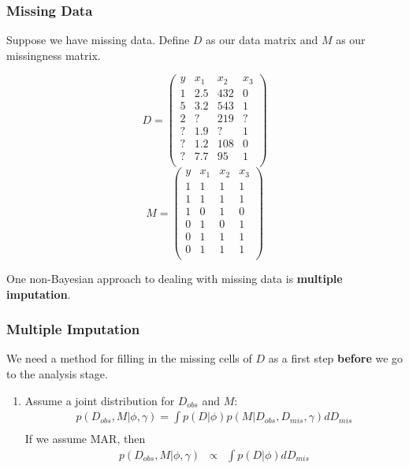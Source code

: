 \documentclass{beamer}
\begin{document}
\begin{frame}
\frametitle{Missing Data}
\pause
Suppose we have missing data.  \pause Define $D$ as our data matrix
and $M$ as our missingness matrix.
\pause
\setlength{\columnseprule}{0pt}
\begin{multicols}{2}
$$
D = \left( \begin{array}{cccc}
y & x_1 & x_2 & x_3\\
1 & 2.5 & 432 & 0 \\
5 & 3.2 & 543 & 1 \\
2 & ? & 219 & ? \\
? & 1.9 & ? & 1  \\
? & 1.2 & 108 & 0 \\
? & 7.7 & 95 & 1 \\
\end{array} \right)
$$
\newpage
$$
M = \left( \begin{array}{cccc}
y & x_1 & x_2 & x_3\\
1 & 1 & 1 & 1 \\
1 & 1 & 1 & 1 \\
1 & 0 & 1 & 0 \\
0 & 1 & 0 & 1  \\
0 & 1 & 1 & 1 \\
0 & 1 & 1 & 1 \\
\end{array} \right)
$$
\end{multicols}
\pause
\bigskip
One non-Bayesian approach to dealing with missing data is {\bf
multiple imputation}.
\end{frame}

\begin{frame}
\frametitle{Multiple Imputation}
\pause
We need a method for filling in the missing cells of $D$ as a first
step {\bf before} we go to the analysis stage. 
\bigskip
\pause
\begin{enumerate}
\item Assume a joint distribution for $D_{obs}$ and $M$:
\pause
\begin{eqnarray*}
p(D_{obs}, M | \phi, \gamma) = \int p(D | \phi) p(M |
D_{obs}, D_{mis}, \gamma) dD_{mis} \\
\end{eqnarray*}
\pause
If we assume MAR, then 
\begin{eqnarray*}
p(D_{obs}, M | \phi, \gamma) &\propto& \int p(D | \phi) dD_{mis} \\
\end{eqnarray*}
\end{enumerate}
\end{frame}
\end{document}
